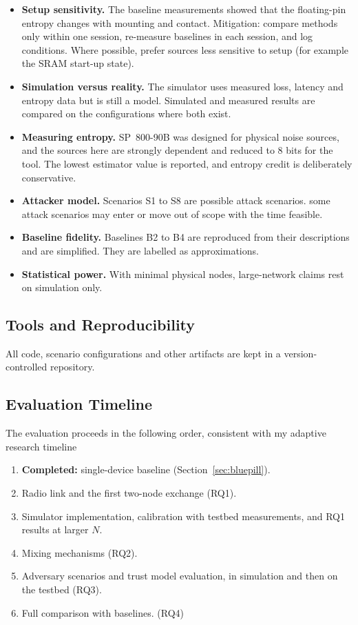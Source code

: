 \documentclass[a4paper, 12pt]{article}
\begin{document}
\begin{itemize}
    \item \textbf{Setup sensitivity.} The baseline measurements showed that the floating-pin entropy changes with mounting and contact. Mitigation: compare methods only within one session, re-measure baselines in each session, and log conditions. Where possible, prefer sources less sensitive to setup (for example the SRAM start-up state).
    \item \textbf{Simulation versus reality.} The simulator uses measured loss, latency and entropy data but is still a model. Simulated and measured results are compared on the configurations where both exist.
    \item \textbf{Measuring entropy.} SP~800-90B was designed for physical noise sources, and the sources here are strongly dependent and reduced to 8 bits for the tool. The lowest estimator value is reported, and entropy credit is deliberately conservative.
    \item \textbf{Attacker model.} Scenarios S1 to S8 are possible attack scenarios. some attack scenarios may enter or move out of scope with the time feasible.
    \item \textbf{Baseline fidelity.} Baselines B2 to B4 are reproduced from their descriptions and are simplified. They are labelled as approximations.
    \item \textbf{Statistical power.} With minimal physical nodes, large-network claims rest on simulation only.
\end{itemize}
 
\subsection{Tools and Reproducibility}
 
All code, scenario configurations and other artifacts are kept in a version-controlled repository.
 
\subsection{Evaluation Timeline}
 
The evaluation proceeds in the following order, consistent with my adaptive research timeline
 
\begin{enumerate}
    \item \textbf{Completed:} single-device baseline (Section~\ref{sec:bluepill}).
    \item Radio link and the first two-node exchange (RQ1).
    \item Simulator implementation, calibration with testbed measurements, and RQ1 results at larger $N$.
    \item Mixing mechanisms (RQ2).
    \item Adversary scenarios and trust model evaluation, in simulation and then on the testbed (RQ3).
    \item Full comparison with baselines. (RQ4)
\end{enumerate}
 
\end{document}
